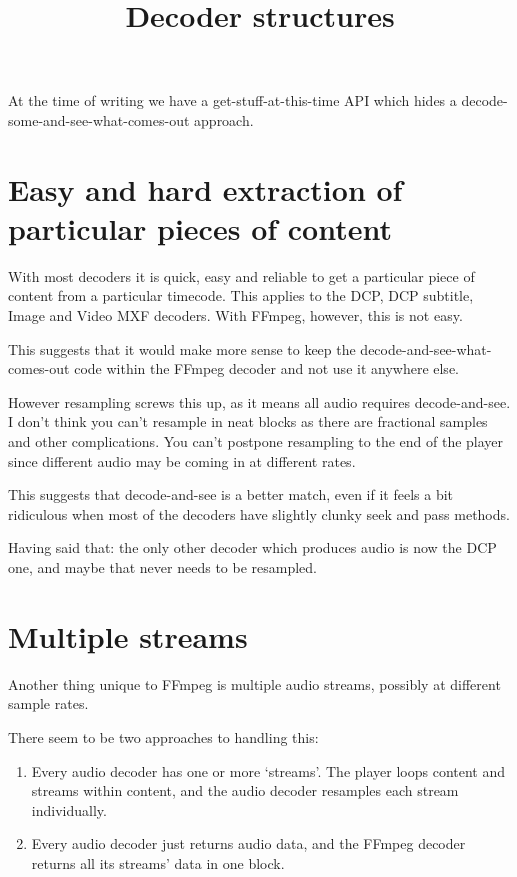 \documentclass{article}
\title{Decoder structures}
\author{}
\date{}
\begin{document}
\maketitle

At the time of writing we have a get-stuff-at-this-time API which
hides a decode-some-and-see-what-comes-out approach.

\section{Easy and hard extraction of particular pieces of content}

With most decoders it is quick, easy and reliable to get a particular
piece of content from a particular timecode.  This applies to the DCP,
DCP subtitle, Image and Video MXF decoders.  With FFmpeg, however,
this is not easy.

This suggests that it would make more sense to keep the
decode-and-see-what-comes-out code within the FFmpeg decoder and not
use it anywhere else.

However resampling screws this up, as it means all audio requires
decode-and-see.  I don't think you can't resample in neat blocks as
there are fractional samples and other complications.  You can't postpone
resampling to the end of the player since different audio may be
coming in at different rates.

This suggests that decode-and-see is a better match, even if it feels
a bit ridiculous when most of the decoders have slightly clunky seek
and pass methods.

Having said that: the only other decoder which produces audio is now
the DCP one, and maybe that never needs to be resampled.


\section{Multiple streams}

Another thing unique to FFmpeg is multiple audio streams, possibly at
different sample rates.

There seem to be two approaches to handling this:

\begin{enumerate}
\item Every audio decoder has one or more `streams'.  The player loops
  content and streams within content, and the audio decoder resamples
  each stream individually.
\item Every audio decoder just returns audio data, and the FFmpeg
  decoder returns all its streams' data in one block.
\end{enumerate}
\end{document}
